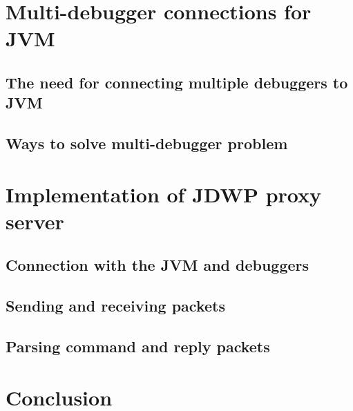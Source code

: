 \documentclass{style/bachelor-thesis}
\begin{document}
\pagebreak

\section{Multi-debugger connections for JVM}
\label{sec:proxy}


\subsection{The need for connecting multiple debuggers to JVM}
\label{sec:need_for_proxy}


\subsection{Ways to solve multi-debugger problem}
\label{sec:proxy_solutions}


\pagebreak

\section{Implementation of JDWP proxy server}
\label{sec:implemenation}


\subsection{Connection with the JVM and debuggers}
\label{sec:impl_connection}


\subsection{Sending and receiving packets}
\label{sec:impl_io}


\subsection{Parsing command and reply packets}
\label{sec:impl_parsing}


\clearpage
\section{Conclusion} 



\newpage

{}

\end{document}
